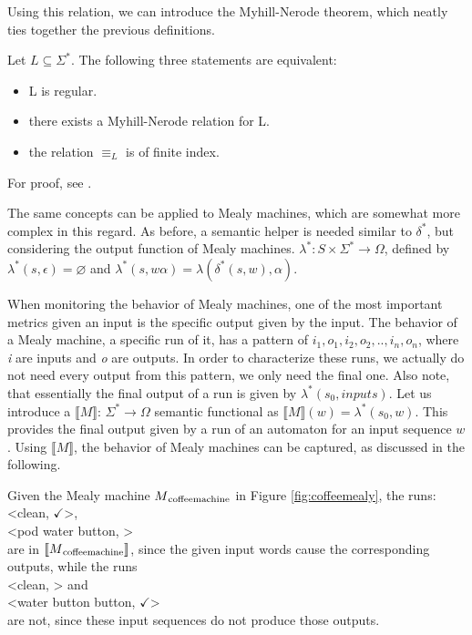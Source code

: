 Using this relation, we can introduce the Myhill-Nerode theorem, which neatly ties together the previous definitions.

\begin{theorem}\label{theorem:Myhill-Nerode}
	Let $L\subseteq\Sigma^*$. The following three statements are equivalent:
	\begin{itemize}
		\item L is regular.
		\item there exists a Myhill-Nerode relation for L.
		\item the relation $\equiv_L$ is of finite index.
	\end{itemize}
	For proof, see \cite{Kozen1977}\cite{10.2307/2033204}.
\end{theorem}

The same concepts can be applied to Mealy machines, which are somewhat more complex in this regard. As before, a semantic helper is needed similar to $\delta^*$, but considering the output function of Mealy machines. $\lambda^*: S\times\Sigma^* \to \Omega$, defined by $\lambda^*(s, \epsilon) = \varnothing$ and $\lambda^*(s, w\alpha) = \lambda(\delta^*(s, w), \alpha)$.



When monitoring the behavior of Mealy machines, one of the most important metrics given an input is the specific output given by the input. The behavior of a Mealy machine, a specific run of it, has a pattern of \textit{$i_1,o_1,i_2,o_2,..,i_n,o_n$}, where \textit{i} are inputs and \textit{o} are outputs. In order to characterize these runs, we actually do not need every output from this pattern, we only need the final one. Also note, that essentially the final output of a run is given by $\lambda^*(s_0, inputs)$. Let us introduce a $\llbracket M\rrbracket$: $\Sigma^*\to\Omega$ semantic functional as  $\llbracket M\rrbracket(w) = \lambda^*(s_0, w)$. This provides the final output given by a run of an automaton for an input sequence $w$. Using $\llbracket M\rrbracket$, the behavior of Mealy machines can be captured, as discussed in the following.

\begin{example}
	Given the Mealy machine $M\textsubscript{coffeemachine}$ in Figure \ref{fig:coffeemealy}, the runs:\\
	\null\qquad<clean, $\checkmark$>, \\
	\null\qquad<pod water button, \Coffeecup> \\
	are in $\llbracket M\textsubscript{coffeemachine}\rrbracket$, since the given input words cause the corresponding outputs, while the runs\\
	\null\qquad<clean, \Coffeecup> and \\
	\null\qquad<water button button, $\checkmark$> \\
	are not, since these input sequences do not produce those outputs.
\end{example}

